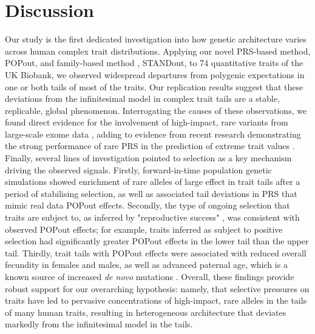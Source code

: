\documentclass[12pt]{zHenriquesLab-StyleBioRxiv}
\begin{document}
{{\section*{Discussion} \label{sec:discussion} 
Our study is the first dedicated investigation into how genetic architecture 
varies across human complex trait distributions. Applying our novel 
PRS-based method, POPout, and family-based method \cite{Souaiaia2024}, STANDout, 
to 74 quantitative traits of the UK Biobank, we observed widespread 
departures from polygenic expectations in one or both tails of most of the traits. 
Our replication results suggest that these deviations from the infinitesimal model 
in complex trait tails are a stable, replicable, global phenomenon. Interrogating 
the causes of these observations, we found direct evidence for the involvement of 
high-impact, rare variants from large-scale exome data \cite{Backman2021}, 
adding to evidence from recent research demonstrating the strong performance 
of rare PRS in the prediction of extreme trait values \cite{Fiziev2023}. 
Finally, several lines of investigation pointed to selection 
as a key mechanism driving the observed signals. Firstly, forward-in-time population 
genetic simulations \cite{BC_2019} showed enrichment of rare alleles of large effect in trait tails 
after a period of stabilising selection, as well as associated tail deviations
in PRS that mimic real data POPout effects. Secondly, the type of ongoing selection that 
traits are subject to, as inferred by "reproductive success" \cite{Sanjak2018}, was consistent with 
observed POPout effects; for example, traits inferred as subject to positive selection 
had significantly greater POPout effects in the lower tail than the upper tail. Thirdly, trait 
tails with POPout effects were associated with reduced overall fecundity in 
females and males, as well as advanced paternal age, which is a known source of 
increased \emph{de novo} mutations \cite{Kong2012}. Overall, these findings provide robust support for 
our overarching hypothesis: namely, that selective pressures on traits have led to 
pervasive concentrations of high-impact, rare alleles in the tails of many human traits, 
resulting in heterogeneous architecture that deviates markedly from the infinitesimal model \cite{Barton2017} in the tails.

}}
\end{document}
